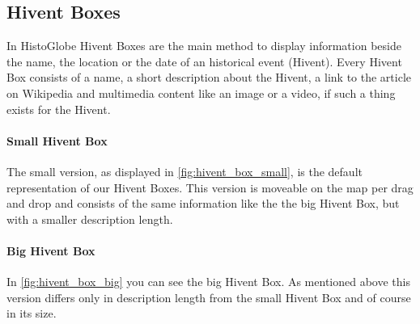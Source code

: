 \subsection{Hivent Boxes}
In HistoGlobe Hivent Boxes are the main method to display information beside the name, the location or the date of an historical event (Hivent). Every Hivent Box consists of a name, a short description about the Hivent, a link to the article on Wikipedia and multimedia content like an image or a video, if such a thing exists for the Hivent.



\paragraph{Small Hivent Box} %
The small version, as displayed in \ref{fig:hivent_box_small}, is the default representation of our Hivent Boxes. This version is moveable on the map per drag and drop and consists of the same information like the the big Hivent Box, but with a smaller description length.


\paragraph{Big Hivent Box} %
In \ref{fig:hivent_box_big} you can see the big Hivent Box. As mentioned above this version differs only in description length from the small Hivent Box and of course in its size. 


